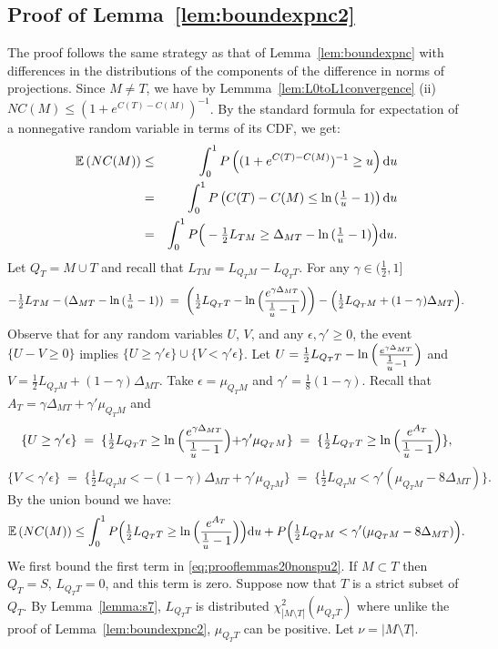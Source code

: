 \documentclass[aos]{imsart}
\theoremstyle{plain}
\newcommand{\E}{\mathbb{E}}
\begin{document}
\begin{supplement}
\subsection{Proof of Lemma~\ref{lem:boundexpnc2}}

The proof follows the same strategy as that of Lemma~\ref{lem:boundexpnc} with differences in the distributions of the components of the difference in norms of projections. Since $M\neq T$, we have by Lemmma~\ref{lem:L0toL1convergence} (ii) $NC(M) \leq (1+e^{C(T)-C(M)})^{-1}$. By the standard formula for expectation of a nonnegative random variable in terms of its CDF, we get:
\begin{eqnarray*}
  \E\left(NC(M)\right)  &\leq& \int_0^1 P\left((1+e^{C(T)-C(M)})^{-1}\geq u\right){\rm d} u\\
  &=&\int_0^1 P\left(C(T)-C(M) \leq \ln{(\tfrac1u-1)}\right){\rm d}u\\
  &=&\int_0^1 P\Big(-\tfrac12 L_{TM} \geq \Delta_{MT}-\ln{(\tfrac1u-1)}\Big) {\rm d}u.
\end{eqnarray*}
Let $Q_T=M \cup T$ and recall that $L_{TM}=L_{Q_TM}-L_{Q_TT}$. For any $\gamma\in (\frac{1}{2},1]$
$$
-\tfrac12 L_{TM} -(\Delta_{MT}-\ln{(\tfrac1u-1)})\;=\;\left(\tfrac12 L_{Q_TT}-\ln{\Bigl(\frac{e^{\gamma\Delta_{MT}}}{\tfrac1u-1}\Bigl)}\right)-\Bigl(\tfrac12 L_{Q_TM}+(1-\gamma)\Delta_{MT}\Bigl).
$$
Observe that for any random variables $U$, $V$, and any $\epsilon,\gamma' \geq 0$, the event $
\{U-V \geq 0\}$ implies $\{U \geq \gamma' \epsilon\}\cup
\{V  < \gamma' \epsilon\}$. Let $U=\tfrac12 L_{Q_TT}-\ln{\Bigl(\frac{e^{\gamma\Delta_{MT}}}{\tfrac1u-1}\Bigl)}$ and $V=\tfrac12 L_{Q_TM}+(1-\gamma)\Delta_{MT}$. Take $\epsilon=\mu_{Q_TM}$ and $\gamma'=\tfrac18({1-\gamma})$. Recall that $A_T=\gamma\Delta_{MT}+\gamma'\mu_{Q_TM}$ and
$$
\{U\geq \gamma'\epsilon\}\;=\;\{\tfrac12 L_{Q_TT}\geq \ln{\Bigl(\frac{e^{\gamma\Delta_{MT}}}{\tfrac1u-1}}\Bigl)+\gamma'\mu_{Q_TM}\}\;=\;\{\tfrac12 L_{Q_TT}\geq \ln{\Bigl(\frac{e^{A_T}}{\tfrac1u-1}}\Bigl)\},
$$
$$
\{V<\gamma'\epsilon\}\;=\;\{\tfrac12 L_{Q_TM}<-(1-\gamma)\Delta_{MT}+\gamma'\mu_{Q_TM}\}\;=\;\{\tfrac12 L_{Q_TM}<\gamma'(\mu_{Q_TM}-8\Delta_{MT})\}.
$$
By the union bound we have:
\begin{equation}\label{eq:prooflemmas20nonspu2}
    \E\left(NC(M)\right)  \leq \int_0^1P\Bigl(\tfrac12 L_{Q_TT}\geq \ln{\Bigl(\frac{e^{A_T}}{\tfrac1u-1}\Bigl)}\Bigl){\rm d}u+ P\Bigl(\tfrac12 L_{Q_TM}<\gamma'(\mu_{Q_TM}-8\Delta_{MT})\Bigl).
\end{equation}
We first bound the first term in \eqref{eq:prooflemmas20nonspu2}. If $M \subset T$ then $Q_T=S$, $L_{Q_TT}=0$, and this term is zero. Suppose now that $T$ is a strict subset of $Q_T$. By Lemma~\ref{lemma:s7}, $L_{Q_TT}$ is distributed $\chi_{|M\setminus T|}^2(\mu_{Q_TT})$ where unlike the proof of  Lemma~\ref{lem:boundexpnc2}, $\mu_{Q_TT}$ can be positive. Let $\nu=|M\setminus T|$.


\end{supplement}
\end{document}
